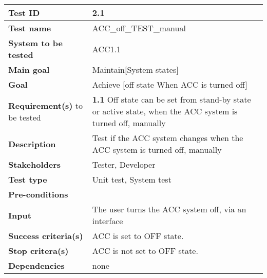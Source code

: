 	\begin{table}[H]
		\begin{tabular}{| p{4cm} | p{10cm} |}
			\hline
			\rowcolor{gray}
			{\bf Test ID} & 2.1 \\ \hline
			{\bf Test name} & ACC\_off\_TEST\_manual \\ \hline
			{\bf System to be tested} & ACC1.1\\ \hline
			{\bf Main goal} & Maintain[System states] \\ \hline
			{\bf Goal} & Achieve [off state When ACC is turned off]\\ \hline
			{\bf Requirement(s)} to be tested & 
			{\bf 1.1} Off state can be set from stand-by state or active state, when 
			the ACC system is turned off, manually \\ \hline
			{\bf Description} & Test if the ACC system changes when the ACC system is 
			turned off, manually \\ \hline
			{\bf Stakeholders} & Tester, Developer \\ \hline
			{\bf Test type} & Unit test, System test \\ \hline
			{\bf Pre-conditions} & \\ \hline
			{\bf Input} & The user turns the ACC system off, via an interface \\ \hline
			{\bf Success criteria(s)} & ACC is set to OFF state. \\ \hline
			{\bf Stop critera(s)} & ACC is not set to OFF state. \\ \hline
			{\bf Dependencies} & none \\ \hline
		\end{tabular}
	\end{table}

